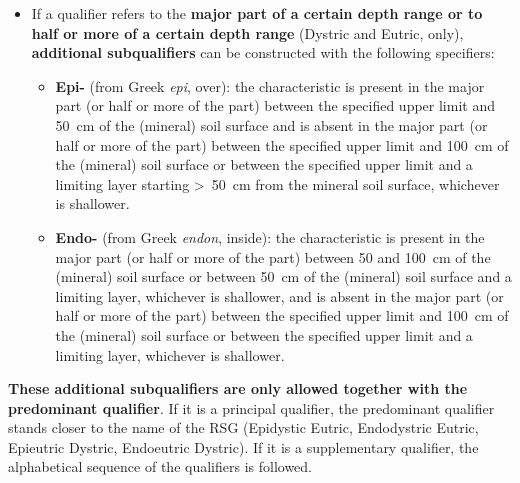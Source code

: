 \documentclass[
  letterpaper,
  DIV=11,
  numbers=noendperiod]{scrreprt}
\providecommand{\tightlist}{%
  \setlength{\itemsep}{0pt}\setlength{\parskip}{0pt}}\usepackage{longtable,booktabs,array}
\begin{document}
\begin{itemize}
\tightlist
\item
  If a qualifier refers to the \textbf{major part of a certain depth
  range or to half or more of a certain depth range} (Dystric and
  Eutric, only), \textbf{additional subqualifiers} can be constructed
  with the following specifiers:

  \begin{itemize}
  \item
    \textbf{Epi-} (from Greek \emph{epi}, over): the characteristic is
    present in the major part (or half or more of the part) between the
    specified upper limit and 50~cm of the (mineral) soil surface and is
    absent in the major part (or half or more of the part) between the
    specified upper limit and 100~cm of the (mineral) soil surface or
    between the specified upper limit and a limiting layer starting
    \textgreater~50~cm from the mineral soil surface, whichever is
    shallower.
  \item
    \textbf{Endo-} (from Greek \emph{endon}, inside): the characteristic
    is present in the major part (or half or more of the part) between
    50 and 100~cm of the (mineral) soil surface or between 50~cm of the
    (mineral) soil surface and a limiting layer, whichever is shallower,
    and is absent in the major part (or half or more of the part)
    between the specified upper limit and 100~cm of the (mineral) soil
    surface or between the specified upper limit and a limiting layer,
    whichever is shallower.
  \end{itemize}
\end{itemize}

\textbf{These additional subqualifiers are only allowed together with
the predominant qualifier}. If it is a principal qualifier, the
predominant qualifier stands closer to the name of the RSG (Epidystic
Eutric, Endodystric Eutric, Epieutric Dystric, Endoeutric Dystric). If
it is a supplementary qualifier, the alphabetical sequence of the
qualifiers is followed.
\end{document}
